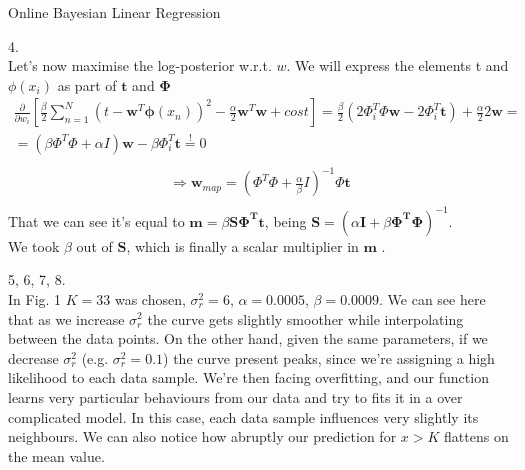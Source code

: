 \documentclass[english]{exercisesheet}
\begin{document}
\begin{nexercise}{Online Bayesian Linear Regression}
\begin{solution}
      \end{solution}
      \par
      \begin{solution} 4.\\
      Let's now maximise the log-posterior w.r.t. $w$.
      We will express the elements t and $\phi(x_{i})$ as part of $\bm{t}$ and $\bm{\Phi}$
      \begin{align*}
          \frac{\partial}{\partial w_{i}}\left[\frac{\beta}{2}\sum_{n=1}^{N}(t-\bm{w}^{T}\bm{\phi}(x_{n}))^{2}-\frac{\alpha}{2}\bm{w}^{T}\bm{w}+cost \right] = \frac{\beta}{2}(2\Phi_{i}^{T}\Phi \bm{w} - 2\Phi_{i}^{T}\bm{t}) + \frac{\alpha}{2}2\bm{w} = \\ = \left(\beta\Phi^{T}\Phi+\alpha I\right)\bm{w}-\beta\Phi_{i}^{T}\bm{t} \stackrel{!}{=} 0 \\
      \end{align*}
      \begin{align*}
          \Rightarrow \bm{w}_{map} = (\Phi^{T}\Phi + \frac{\alpha}{\beta}I)^{-1}\Phi \bm{t} \\
      \end{align*}
      That we can see it's equal to $\bm{m} = \beta\bm{S\Phi^{T}t}$, being $\bm{S}=\left(\alpha \bm{I} +\beta \bm{\Phi^{T}\Phi}\right)^{-1}$.\\ We took $\beta$ out of $\bm{S}$, which is finally a scalar multiplier in $\bm{m}$ .\\
      \end{solution}
      \par
      \begin{solution} 5, 6, 7, 8.\\
            In Fig. 1 $K = 33$ was chosen,
            $\sigma_{r}^{2} = 6$, $\alpha = 0.0005$, $\beta = 0.0009$.
              We can see here that as we increase $\sigma_{r}^{2}$ the curve gets slightly smoother while interpolating between the data points. On the other hand, given the same parameters, if we decrease $\sigma_{r}^{2}$ (e.g. $\sigma_{r}^{2} = 0.1$) the curve present peaks, since we're assigning a high likelihood to each data sample. We're then facing overfitting, and our function learns very particular behaviours from our data and try to fits it in a over complicated model.
              In this case, each data sample influences very slightly its neighbours.
            We can also notice how abruptly our prediction for $x > K$ flattens on the mean value.
        \begin{figure}
        \centering

\end{figure}
\end{solution}
\end{nexercise}
\end{document}
